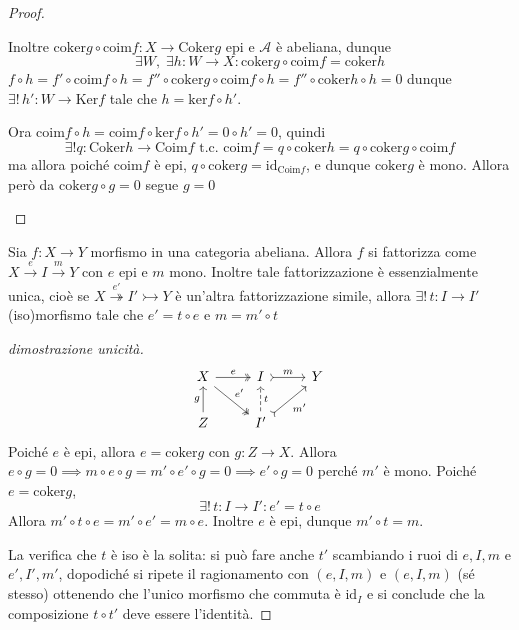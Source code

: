 \begin{proof}{}
\begin{enumerate}[label = \arabic*.]
\begin{itemize}
    Inoltre \(\mathrm{coker}g \circ \mathrm{coim}f : X \to \mathrm{Coker}g\)
    epi e \(\mathcal{A}\) è abeliana, dunque
    \[
      \exists W, \;\exists h : W \to X : \mathrm{coker}g \circ \mathrm{coim}f = \mathrm{coker}h
    \]
    \(f \circ h = f' \circ \mathrm{coim}f \circ h = f'' \circ \mathrm{coker}g
    \circ \mathrm{coim}f \circ h = f'' \circ \mathrm{coker}h \circ h = 0\)
    dunque \(\exists !\, h' : W \to \mathrm{Ker}f\) tale che \(h = \mathrm{ker}f
    \circ h'\). 

    Ora \(\mathrm{coim}f \circ h = \mathrm{coim}f \circ \mathrm{ker}f \circ h' =
    0 \circ h' = 0\), quindi \[\exists ! q: \mathrm{Coker}h \to \mathrm{Coim}f
    \text{ t.c. } \mathrm{coim}f = q \circ \mathrm{coker}h = q \circ
\mathrm{coker}g \circ \mathrm{coim}f\]
    ma allora poiché \(\mathrm{coim}f\) è epi, \(q \circ \mathrm{coker}g =
    \mathrm{id}_{\mathrm{Coim}f}\), e dunque \(\mathrm{coker}g\) è mono. Allora
    però da \(\mathrm{coker}g \circ g = 0\) segue \(g = 0\) 
    \end{itemize}
\end{enumerate}
\end{proof}

\begin{corollary}{}
    Sia \(f: X \to Y\) morfismo in una categoria abeliana. Allora \(f\) si
    fattorizza come \(X \overset{e}{\to } I \overset{m}{\to } Y\) con \(e\) epi
    e \(m\) mono. Inoltre tale fattorizzazione è essenzialmente unica, cioè se
    \(X \overset{e'}{\twoheadrightarrow } I' \overset{}{\rightarrowtail} Y\) è un'altra
    fattorizzazione simile, allora \(\exists ! \, t : I \to I'\) (iso)morfismo
    tale che \(e' = t \circ e\) e \(m = m' \circ t\) 
\end{corollary}
\begin{proof}[dimostrazione unicità]
\[\begin{tikzcd}
	X & I & Y \\
	Z & {I'}
	\arrow["e", two heads, from=1-1, to=1-2]
	\arrow["{e'}", two heads, from=1-1, to=2-2]
	\arrow["m", tail, from=1-2, to=1-3]
	\arrow["g", from=2-1, to=1-1]
	\arrow["t"', dashed, from=2-2, to=1-2]
	\arrow["{m'}"', tail, from=2-2, to=1-3]
\end{tikzcd}\]
    Poiché \(e\) è epi, allora \(e = \mathrm{coker}g \) con \(g : Z \to X\).
    Allora \(e \circ g = 0 \implies m \circ e \circ g = m' \circ e' \circ g = 0 \implies e' \circ g = 0\) perché \(m'\) è mono. Poiché \(e = \mathrm{coker}g\), 
    \[
      \exists ! \, t : I \to I' : e' = t \circ e
    \]
    Allora \(m' \circ t \circ e = m' \circ e' = m \circ e\). Inoltre \(e\) è
    epi, dunque \(m' \circ t = m\).

    La verifica che \(t\) è iso è la solita: si può fare anche \(t'\) scambiando
    i ruoi di \(e, I, m\) e \(e', I', m'\), dopodiché si ripete il ragionamento
    con \({(e, I, m)}\) e \({(e, I, m)}\) (sé stesso) ottenendo che l'unico
    morfismo che commuta è \(\mathrm{id}_I\) e si conclude che la composizione
    \(t \circ t'\) deve essere l'identità.
\end{proof}


